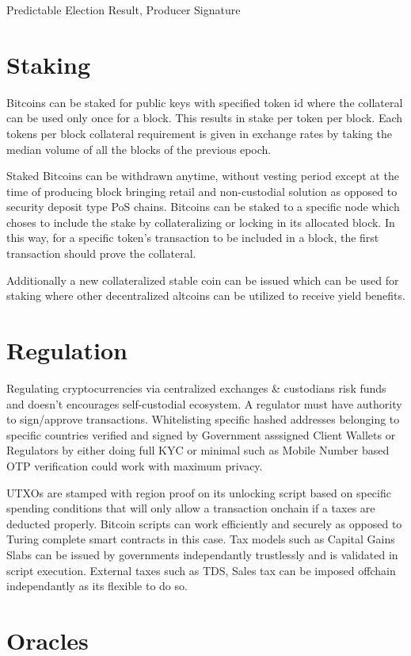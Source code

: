 \documentclass[a4paper,10pt]{article}
\begin{document}
Predictable Election Result, Producer Signature


\section{Staking}

Bitcoins can be staked for public keys with specified token id where the collateral can be used only once for a block. This results in stake per token per block. Each tokens per block collateral requirement is given in exchange rates by taking the median volume of all the blocks of the previous epoch.

Staked Bitcoins can be withdrawn anytime, without vesting period except at the time of producing block bringing retail and non-custodial solution as opposed to security deposit type PoS chains. Bitcoins can be staked to a specific node which choses to include the stake by collateralizing or locking in its allocated block. In this way, for a specific token's transaction to be included in a block, the first transaction should prove the collateral.

 Additionally a new collateralized stable coin can be issued which can be used for staking where other decentralized altcoins can be utilized to receive yield benefits. 

\section{Regulation}
Regulating cryptocurrencies via centralized exchanges \& custodians risk funds and doesn't encourages self-custodial ecosystem. A regulator must have authority to sign/approve transactions. Whitelisting specific hashed addresses belonging to specific countries verified and signed by Government asssigned Client Wallets or Regulators by either doing full KYC or minimal such as Mobile Number based OTP verification could work with maximum privacy. 

UTXOs are stamped with region proof on its unlocking script based on specific spending conditions that will only allow a transaction onchain if a taxes are deducted properly. Bitcoin scripts can work efficiently and securely as opposed to Turing complete smart contracts in this case. Tax models such as Capital Gains Slabs can be issued by governments independantly trustlessly and is validated in script execution. External taxes such as TDS, Sales tax can be imposed offchain independantly as its flexible to do so.

\section{Oracles}
\end{document}
